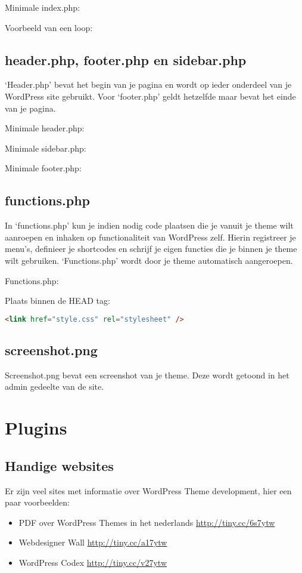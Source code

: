 \documentclass[8pt,pagesize,footinclude=false,headinclude=false]{scrartcl}
\begin{document}
\begin{multicols*}{4}
\noindent Minimale index.php:


\noindent Voorbeeld van een loop:


\subsection*{header.php, footer.php en sidebar.php}
`Header.php' bevat het begin van je pagina en wordt op ieder onderdeel van je WordPress site gebruikt. Voor `footer.php' geldt hetzelfde maar bevat het einde van je pagina.

\noindent Minimale header.php:


\noindent Minimale sidebar.php:


\noindent Minimale footer.php:


\subsection*{functions.php}
In `functions.php' kun je indien nodig code plaatsen die je vanuit je theme wilt aanroepen en inhaken op functionaliteit van WordPress zelf. Hierin registreer je menu's, definieer je shortcodes en schrijf je eigen functies die je binnen je theme wilt gebruiken. `Functions.php' wordt door je theme automatisch aangeroepen.

\noindent Functions.php:


\noindent Plaats binnen de HEAD tag:
\begin{lstlisting}[language=HTML]
	<link href="style.css" rel="stylesheet" />
\end{lstlisting}


\subsection*{screenshot.png}
Screenshot.png bevat een screenshot van je theme. Deze wordt getoond in het admin gedeelte van de site.

\clearpage

\section*{Plugins}

\clearpage

\subsection*{Handige websites}
Er zijn veel sites met informatie over WordPress Theme development, hier een paar voorbeelden:
\begin{itemize}
	\item PDF over WordPress Themes in het nederlands \url{http://tiny.cc/6s7ytw}
	\item Webdesigner Wall \url{http://tiny.cc/a17ytw}
	\item WordPress Codex \url{http://tiny.cc/v27ytw}
\end{itemize}

\end{multicols*}
\end{document}

